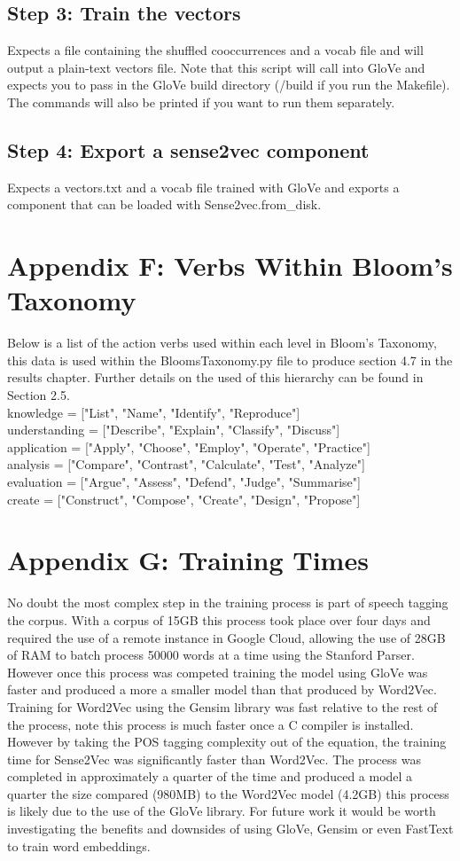 \subsection*{Step 3: Train the vectors}
Expects a file containing the shuffled cooccurrences and a vocab file and will output a plain-text vectors file. Note that this script will call into GloVe and expects you to pass in the GloVe build directory (/build if you run the Makefile). The commands will also be printed if you want to run them separately.

\subsection*{Step 4: Export a sense2vec component}
Expects a vectors.txt and a vocab file trained with GloVe and exports a component that can be loaded with Sense2vec.from\_disk.

\section*{Appendix F: Verbs Within Bloom's Taxonomy}
Below is a list of the action verbs used within each level in Bloom's Taxonomy, this data is used within the BloomsTaxonomy.py file to produce section 4.7 in the results chapter. Further details on the used of this hierarchy can be found in Section 2.5.\\
knowledge = ["List", "Name", "Identify", "Reproduce"]\\
understanding = ["Describe", "Explain", "Classify", "Discuss"]\\
application = ["Apply", "Choose", "Employ", "Operate", "Practice"]\\
analysis = ["Compare", "Contrast", "Calculate", "Test", "Analyze"]\\
evaluation = ["Argue", "Assess", "Defend", "Judge", "Summarise"]\\
create = ["Construct", "Compose", "Create", "Design", "Propose"]

\section*{Appendix G: Training Times}
No doubt the most complex step in the training process is part of speech tagging the corpus. With a corpus of 15GB this process took place over four days and required the use of a remote instance in Google Cloud, allowing the use of 28GB of RAM to batch process 50000 words at a time using the Stanford Parser. However once this process was competed training the model using GloVe was faster and produced a more a smaller model than that produced by Word2Vec. Training for Word2Vec using the Gensim library was fast relative to the rest of the process, note this process is much faster once a C compiler is installed. However by taking the POS tagging complexity out of the equation, the training time for Sense2Vec was significantly faster than Word2Vec. The process was completed in approximately a quarter of the time and produced a model a quarter the size compared (980MB) to the Word2Vec model (4.2GB) this process is likely due to the use of the GloVe library. For future work it would be worth investigating the benefits and downsides of using GloVe, Gensim or even FastText to train word embeddings.